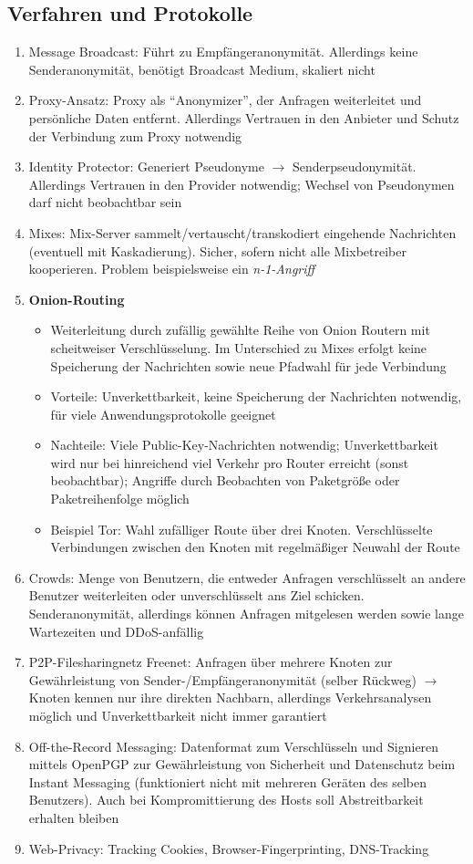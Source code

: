\subsection{Verfahren und Protokolle}
\begin{enumerate}
	\item Message Broadcast: Führt zu Empfängeranonymität. Allerdings keine Senderanonymität, benötigt Broadcast Medium, skaliert nicht
	\item Proxy-Ansatz: Proxy als "`Anonymizer"', der Anfragen weiterleitet und persönliche Daten entfernt. Allerdings Vertrauen in den Anbieter und Schutz der Verbindung zum Proxy notwendig
	\item Identity Protector: Generiert Pseudonyme \(\rightarrow\) Senderpseudonymität. Allerdings Vertrauen in den Provider notwendig; Wechsel von Pseudonymen darf nicht beobachtbar sein
	\item Mixes: Mix-Server sammelt/vertauscht/transkodiert eingehende Nachrichten (eventuell mit Kaskadierung). Sicher, sofern nicht alle Mixbetreiber kooperieren. Problem beispielsweise ein \textit{n-1-Angriff}
	\item \textbf{Onion-Routing}
	\begin{itemize}
		\item Weiterleitung durch zufällig gewählte Reihe von Onion Routern mit scheitweiser Verschlüsselung. Im Unterschied zu Mixes erfolgt keine Speicherung der Nachrichten sowie neue Pfadwahl für jede Verbindung
		\item Vorteile: Unverkettbarkeit, keine Speicherung der Nachrichten notwendig, für viele Anwendungsprotokolle geeignet
		\item Nachteile: Viele Public-Key-Nachrichten notwendig; Unverkettbarkeit wird nur bei hinreichend viel Verkehr pro Router erreicht (sonst beobachtbar); Angriffe durch Beobachten von Paketgröße oder Paketreihenfolge möglich
		\item Beispiel Tor: Wahl zufälliger Route über drei Knoten. Verschlüsselte Verbindungen zwischen den Knoten mit regelmäßiger Neuwahl der Route
	\end{itemize}
	\item Crowds: Menge von Benutzern, die entweder Anfragen verschlüsselt an andere Benutzer weiterleiten oder unverschlüsselt ans Ziel schicken. Senderanonymität, allerdings können Anfragen mitgelesen werden sowie lange Wartezeiten und DDoS-anfällig
	\item P2P-Filesharingnetz Freenet: Anfragen über mehrere Knoten zur Gewährleistung von Sender-/Empfängeranonymität (selber Rückweg) \(\rightarrow\) Knoten kennen nur ihre direkten Nachbarn, allerdings Verkehrsanalysen möglich und Unverkettbarkeit nicht immer garantiert
	\item Off-the-Record Messaging: Datenformat zum Verschlüsseln und Signieren mittels OpenPGP zur Gewährleistung von Sicherheit und Datenschutz beim Instant Messaging (funktioniert nicht mit mehreren Geräten des selben Benutzers). Auch bei Kompromittierung des Hosts soll Abstreitbarkeit erhalten bleiben
	\item Web-Privacy: Tracking Cookies, Browser-Fingerprinting, DNS-Tracking
\end{enumerate}

